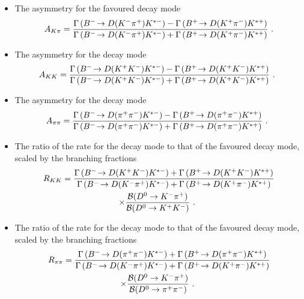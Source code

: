 \begin{itemize}
\item{The \CP asymmetry for the favoured decay mode
\begin{equation}
A_{{K}\pi} = \frac{\Gamma\left({{{B}^-}}\!\rightarrow {\ensuremath{D}}({{K}^-}{{\pi}^+}){{K}^{*-}}\right) - \Gamma\left({{{B}^+}}\!\rightarrow {\ensuremath{D}}({{K}^+}{{\pi}^-}){{K}^{*+}}\right)}{\Gamma\left({{{B}^-}}\!\rightarrow {\ensuremath{D}}({{K}^-}{{\pi}^+}){{K}^{*-}}\right) + \Gamma\left({{{B}^+}}\!\rightarrow {\ensuremath{D}}({{K}^+}{{\pi}^-}){{K}^{*+}}\right)} \text{ .}
\label{eqn:Akpi}
\end{equation}}
\item{The \CP asymmetry for the \decay{\D}{\Kp\Km} decay mode
\begin{equation}
A_{{K}{K}} = \frac{\Gamma\left({{{B}^-}}\!\rightarrow {\ensuremath{D}}({{K}^+}{{K}^-}){{K}^{*-}}\right) - \Gamma\left({{{B}^+}}\!\rightarrow {\ensuremath{D}}({{K}^+}{{K}^-}){{K}^{*+}}\right)}{\Gamma\left({{{B}^-}}\!\rightarrow {\ensuremath{D}}({{K}^+}{{K}^-}){{K}^{*-}}\right) + \Gamma\left({{{B}^+}}\!\rightarrow {\ensuremath{D}}({{K}^+}{{K}^-}){{K}^{*+}}\right)} \text{ . }
\label{eqn:Akk}
\end{equation}
}
\item{The \CP asymmetry for the \decay{\D}{\pip\pim} decay mode
\begin{equation}
A_{\pi\pi} = \frac{\Gamma\left({{{B}^-}}\!\rightarrow {\ensuremath{D}}({{\pi}^+}{{\pi}^-}){{K}^{*-}}\right) - \Gamma\left({{{B}^+}}\!\rightarrow {\ensuremath{D}}({{\pi}^+}{{\pi}^-}){{K}^{*+}}\right)}{\Gamma\left({{{B}^-}}\!\rightarrow {\ensuremath{D}}({{\pi}^+}{{\pi}^-}){{K}^{*-}}\right) + \Gamma\left({{{B}^+}}\!\rightarrow {\ensuremath{D}}({{\pi}^+}{{\pi}^-}){{K}^{*+}}\right)} \text{ . }
\label{eqn:Apipi}
\end{equation}}
\item{The ratio of the rate for the \decay{\D}{\Kp\Km} decay mode to that of the favoured decay mode, scaled by the branching fractions
\begin{multline}
R_{{K}{K}} = \frac{\Gamma\left({{{B}^-}}\!\rightarrow {\ensuremath{D}}({{K}^+}{{K}^-}){{K}^{*-}}\right) + \Gamma\left({{{B}^+}}\!\rightarrow {\ensuremath{D}}({{K}^+}{{K}^-}){{K}^{*+}}\right)}{\Gamma\left({{{B}^-}}\!\rightarrow {\ensuremath{D}}({{K}^-}{{\pi}^+}){{K}^{*-}}\right) + \Gamma\left({{{B}^+}}\!\rightarrow {\ensuremath{D}}({{K}^+}{{\pi}^-}){{K}^{*+}}\right)} \\ \times \frac{{\mathcal{B}}(D^0 \rightarrow K^-\pi^+)}{{\mathcal{B}}(D^0 \rightarrow K^+K^-)} \text{ . }
\label{eqn:Rkk}
\end{multline}
}
\item{The ratio of the rate for the \decay{\D}{\pip\pim} decay mode to that of the favoured decay mode, scaled by the branching fractions
\begin{multline}
R_{\pi\pi} = \frac{\Gamma\left(\decay{\Bm}{\D(\pip\pim)\Kstarm}\right) + \Gamma\left(\decay{\Bp}{\D(\pip\pim)\Kstarp}\right)}{\Gamma\left(\decay{\Bm}{\D(\Km\pip)\Kstarm}\right) + \Gamma\left(\decay{\Bp}{\D(\Kp\pim)\Kstarp}\right)} \\ \times \frac{\BR(D^0 \to K^-\pi^+)}{\BR(D^0 \to \pi^+\pi^-)} \text{ . }

\end{multline}}
\end{itemize}
